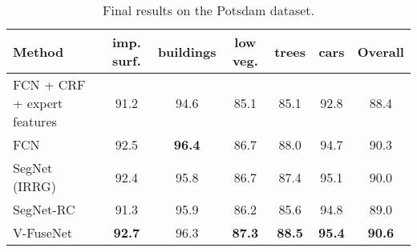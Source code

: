 \begin{table}
    \caption{Final results on the Potsdam dataset.}
    \label{table:final_potsdam}
    \setlength\tabcolsep{4pt}
	\begin{tabularx}{\textwidth}{Y c c c c c c}
    \toprule
	Method & imp. surf. & buildings & low veg. & trees & cars & Overall\\
    \midrule
    FCN + CRF + expert features~\cite{Liu_2017_CVPR_Workshops} & 91.2 & 94.6 & 85.1 & 85.1 & 92.8 & 88.4\\
    FCN~\cite{sherrah_fully_2016} & 92.5 & \textbf{96.4} & 86.7 & 88.0 & 94.7 & 90.3\\
    \midrule
    SegNet (IRRG) & 92.4 & 95.8 & 86.7 & 87.4 & 95.1 & 90.0\\
	SegNet-RC & 91.3 & 95.9 & 86.2 & 85.6 & 94.8 & 89.0\\
    V-FuseNet & \textbf{92.7} & 96.3 & \textbf{87.3} & \textbf{88.5} & \textbf{95.4} & \textbf{90.6}\\
    \bottomrule
    \end{tabularx}
\end{table}


